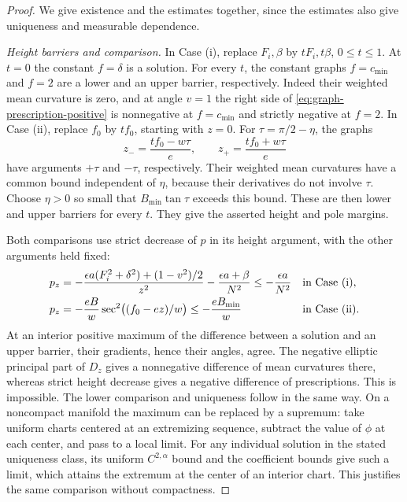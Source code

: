 \begin{proof}
We give existence and the estimates together, since the estimates
also give uniqueness and measurable dependence.

\emph{Height barriers and comparison.}
In Case \textup{(i)}, replace \(F_i,\beta\) by \(tF_i,t\beta\),
\(0\le t\le1\).  At \(t=0\) the constant \(f=\delta\) is a
solution.  For every \(t\), the constant graphs \(f=c_{\min}\) and
\(f=2\) are a lower and an upper barrier, respectively.  Indeed their
weighted mean curvature is zero, and at angle \(v=1\) the right side
of \eqref{eq:graph-prescription-positive} is nonnegative at
\(f=c_{\min}\) and strictly negative at \(f=2\).  In Case
\textup{(ii)}, replace \(f_0\) by \(tf_0\), starting with \(z=0\).
For \(\tau=\pi/2-\eta\), the graphs
\[
 z_-=\frac{tf_0-w\tau}{e},\qquad
 z_+=\frac{tf_0+w\tau}{e}
\]
have arguments \(+\tau\) and \(-\tau\), respectively.  Their
weighted mean curvatures have a common bound independent of
\(\eta\), because their derivatives do not involve \(\tau\).
Choose \(\eta>0\) so small that \(B_{\min}\tan\tau\) exceeds this
bound.  These are then lower and upper barriers for every \(t\).
They give the asserted height and pole margins.

Both comparisons use strict decrease of \(p\) in its height
argument, with the other arguments held fixed:
\begin{align}
 p_z&=-\frac{\epsilon a(F_i^2+\delta^2)+(1-v^2)/2}{z^2}
        -\frac{\epsilon a+\beta}{N^2}
       \le-\frac{\epsilon a}{N^2}
       &&\text{in Case \textup{(i)}}, \notag\\
 p_z&=-\frac{eB}{w}\sec^2\bigl((f_0-ez)/w\bigr)
       \le-\frac{eB_{\min}}w
       &&\text{in Case \textup{(ii)}}.
 \label{eq:graph-height-monotonicity}
\end{align}
At an interior positive maximum of the difference between a
solution and an upper barrier, their gradients, hence their angles,
agree.  The negative elliptic principal part of \(D_z\) gives a
nonnegative difference of mean curvatures there, whereas strict
height decrease gives a negative difference of prescriptions.
This is impossible.  The lower comparison and uniqueness follow in
the same way.  On a noncompact manifold the maximum can be replaced
by a supremum: take uniform charts centered at an extremizing
sequence, subtract the value of \(\phi\) at each center, and pass to
a local limit.  For any individual solution in the stated uniqueness
class, its uniform \(C^{2,\alpha}\) bound and the coefficient bounds
give such a limit, which attains the extremum at the center of an
interior chart.  This
justifies the same comparison without compactness.


\end{proof}
